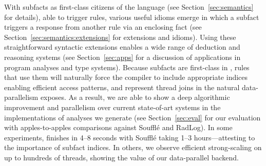 With subfacts as first-class citizens of the language (see Section~\ref{sec:semantics} for details), able to trigger rules, various useful idioms emerge in which a subfact triggers a response from another rule via an enclosing fact (see Section~\ref{sec:semantics:extensions} for extensions and idioms). Using these straightforward syntactic extensions enables a wide range of deduction and reasoning systems (see Section~\ref{sec:apps} for a discussion of applications in program analyses and type systems). Because subfacts are first-class in \slog{}, rules that use them will naturally force the compiler to include appropriate indices enabling efficient access patterns, and represent thread joins in the natural data-parallelism \slog{} exposes. As a result, we are able to show a deep algorithmic improvement and parallelism over current state-of-art systems in the implementations of analyses we generate (see Section~\ref{sec:eval} for our evaluation with apples-to-apples comparisons against Souffl\'e and RadLog). In some experiments, \slog{} finishes in 4--8 seconds with Souffl\'e taking 1--3 hours---attesting to the importance of subfact indices. In others, we observe efficient strong-scaling on up to hundreds of threads, showing the value of our data-parallel backend. 



